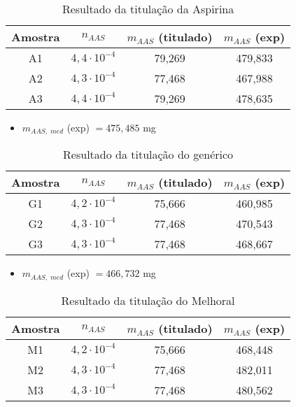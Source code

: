 \begin{table}[H]
    \centering
    \begin{tabular}{c c c c}
        \toprule
        Amostra & $n_{AAS}$ & $m_{AAS}$ (titulado) & $m_{AAS}$ (exp) \\
        \midrule
        A1 & $4,4\cdot 10^{-4}$ & 79,269 & 479,833 \\
        A2 & $4,3\cdot 10^{-4}$ & 77,468 & 467,988\\
        A3 & $4,4\cdot 10^{-4}$ & 79,269 & 478,635 \\
        \bottomrule
    \end{tabular}
    \caption{Resultado da titulação da Aspirina\R}
    \label{res_aspirina}
\end{table}

\begin{itemize}
    \item $m_{AAS,\; med}$ (exp) $= 475,485$ mg
\end{itemize}

\begin{table}[H]
    \centering
    \begin{tabular}{c c c c}
        \toprule
        Amostra & $n_{AAS}$ & $m_{AAS}$ (titulado) & $m_{AAS}$ (exp) \\
        \midrule
        G1 & $4,2\cdot 10^{-4}$ & 75,666 & 460,985 \\
        G2 & $4,3\cdot 10^{-4}$ & 77,468 & 470,543 \\
        G3 & $4,3\cdot 10^{-4}$ & 77,468 & 468,667 \\
        \bottomrule
    \end{tabular}
    \caption{Resultado da titulação do genérico}
    \label{res_generico}
\end{table}

\begin{itemize}
    \item $m_{AAS,\; med}$ (exp) $= 466,732$ mg
\end{itemize}

\begin{table}[H]
    \centering
    \begin{tabular}{c c c c}
        \toprule
        Amostra & $n_{AAS}$ & $m_{AAS}$ (titulado) & $m_{AAS}$ (exp) \\
        \midrule
        M1 & $4,2\cdot 10^{-4}$ & 75,666 & 468,448 \\
        M2 & $4,3\cdot 10^{-4}$ & 77,468 & 482,011 \\
        M3 & $4,3\cdot 10^{-4}$ & 77,468 & 480,562 \\
        \bottomrule
    \end{tabular}
    \caption{Resultado da titulação do Melhoral}
    \label{res_melhoral}
\end{table}

